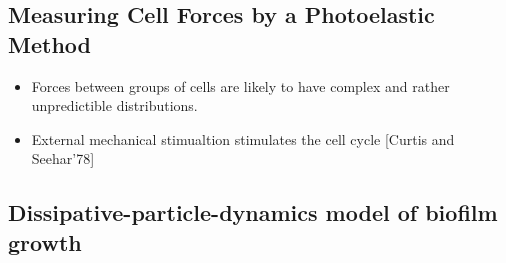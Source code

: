 \documentclass[10pt,a4paper]{article}
\begin{document}
\subsection{Measuring Cell Forces by a Photoelastic Method \cite{cur:07}}
\begin{itemize}
 \item Forces between groups of cells are likely to have complex and rather unpredictible distributions.
 \item External mechanical stimualtion stimulates the cell cycle [Curtis and Seehar'78]
\end{itemize}



\subsection{Dissipative-particle-dynamics model of biofilm growth\cite{scheibe:11}}
\end{document}
